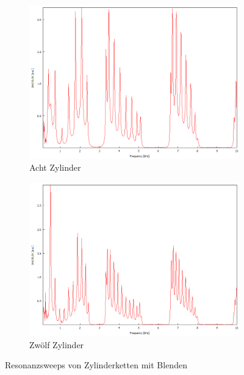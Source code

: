 \begin{figure}
\begin{subfigure}{0.4\textwidth}
    \includegraphics[width=\textwidth]{Bilder/Zylinderketten/rein_8.png}
    \caption{Acht Zylinder}
  \end{subfigure}
  \begin{subfigure}{0.4\textwidth}
    \centering
    \includegraphics[width=\textwidth]{Bilder/Zylinderketten/rein_12.png}
    \caption{Zwölf Zylinder}
  \end{subfigure}
  \caption{Resonanzsweeps von Zylinderketten mit Blenden}
  \label{fig:zylinder_blenden_rein}
\end{figure}

